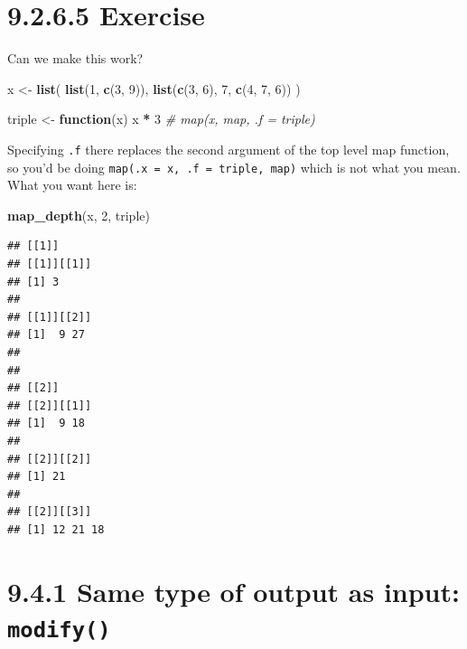 \documentclass[]{book}
\newenvironment{Shaded}{\begin{snugshade}}{\end{snugshade}}
\newcommand{\CommentTok}[1]{\textcolor[rgb]{0.56,0.35,0.01}{\textit{#1}}}
\newcommand{\ControlFlowTok}[1]{\textcolor[rgb]{0.13,0.29,0.53}{\textbf{#1}}}
\newcommand{\DecValTok}[1]{\textcolor[rgb]{0.00,0.00,0.81}{#1}}
\newcommand{\KeywordTok}[1]{\textcolor[rgb]{0.13,0.29,0.53}{\textbf{#1}}}
\newcommand{\NormalTok}[1]{#1}
\newcommand{\OperatorTok}[1]{\textcolor[rgb]{0.81,0.36,0.00}{\textbf{#1}}}
\newcommand{\StringTok}[1]{\textcolor[rgb]{0.31,0.60,0.02}{#1}}
\begin{document}
\hypertarget{exercise-9}{%
\section*{9.2.6.5 Exercise}\label{exercise-9}}

Can we make this work?

\begin{Shaded}
\begin{Highlighting}[]
\NormalTok{x <-}\StringTok{ }\KeywordTok{list}\NormalTok{(}
  \KeywordTok{list}\NormalTok{(}\DecValTok{1}\NormalTok{, }\KeywordTok{c}\NormalTok{(}\DecValTok{3}\NormalTok{, }\DecValTok{9}\NormalTok{)),}
  \KeywordTok{list}\NormalTok{(}\KeywordTok{c}\NormalTok{(}\DecValTok{3}\NormalTok{, }\DecValTok{6}\NormalTok{), }\DecValTok{7}\NormalTok{, }\KeywordTok{c}\NormalTok{(}\DecValTok{4}\NormalTok{, }\DecValTok{7}\NormalTok{, }\DecValTok{6}\NormalTok{))}
\NormalTok{)}

\NormalTok{triple <-}\StringTok{ }\ControlFlowTok{function}\NormalTok{(x) x }\OperatorTok{*}\StringTok{ }\DecValTok{3}
\CommentTok{# map(x, map, .f = triple)}
\end{Highlighting}
\end{Shaded}

Specifying \texttt{.f} there replaces the second argument of the top level map function, so you'd be doing \texttt{map(.x\ =\ x,\ .f\ =\ triple,\ map)} which is not what you mean. What you want here is:

\begin{Shaded}
\begin{Highlighting}[]
\KeywordTok{map_depth}\NormalTok{(x, }\DecValTok{2}\NormalTok{, triple)}
\end{Highlighting}
\end{Shaded}

\begin{verbatim}
## [[1]]
## [[1]][[1]]
## [1] 3
## 
## [[1]][[2]]
## [1]  9 27
## 
## 
## [[2]]
## [[2]][[1]]
## [1]  9 18
## 
## [[2]][[2]]
## [1] 21
## 
## [[2]][[3]]
## [1] 12 21 18
\end{verbatim}

\hypertarget{same-type-of-output-as-input-modify}{%
\section*{\texorpdfstring{9.4.1 Same type of output as input: \texttt{modify()}}{9.4.1 Same type of output as input: modify()}}\label{same-type-of-output-as-input-modify}}
\end{document}
